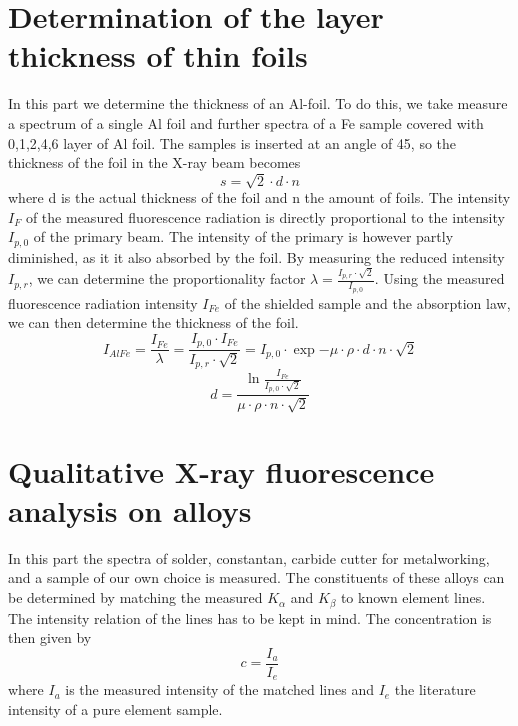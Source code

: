 \section{Determination of the layer thickness of thin foils}
\label{section: determination}
In this part we determine the thickness of an Al-foil. To do this, we take measure a spectrum of a single Al foil and further spectra of a Fe sample covered with 0,1,2,4,6 layer of Al foil.
The samples is inserted at an angle of 45\degree, so the thickness of the foil in the X-ray beam becomes
$$s = \sqrt{2} \cdot d \cdot n$$
where d is the actual thickness of the foil and n the amount of foils. 
The intensity $I_F$ of the measured fluorescence radiation is directly proportional to the intensity $I_{p,0}$ of the primary beam. The intensity of the primary is however partly diminished, as it it also absorbed by the foil. By measuring the reduced intensity $I_{p,r}$, we can determine the proportionality factor $\lambda = \frac{I_{p,r} \cdot \sqrt{2}}{I_{p,0}}$. Using the measured fluorescence radiation intensity $I_{Fe}$ of the shielded sample and the absorption law, we can then determine the thickness of the foil. 
$$I_{AlFe} = \frac{I_{Fe}}{\lambda} = \frac{I_{p,0} \cdot I_{Fe}}{I_{p,r} \cdot \sqrt{2}} = I_{p,0} \cdot \exp{-\mu \cdot \rho \cdot d \cdot n \cdot \sqrt{2}}$$
$$d = \frac{\ln{\frac{I_{Fe}}{I_{p,0}\cdot \sqrt{2}}}}{\mu \cdot \rho \cdot n  \cdot \sqrt{2}}$$


\section{Qualitative X-ray fluorescence analysis on alloys}
In this part the spectra of solder, constantan, carbide cutter for
metalworking, and a sample of our own choice is measured. The constituents of these alloys can be determined by matching the measured $K_\alpha$ and $K_\beta$ to known element lines. The intensity relation of the lines has to be kept in mind. The concentration is then given by $$c = \frac{I_a}{I_e}$$ where $I_a$ is the measured intensity of the matched lines and $I_e$ the literature intensity of a pure element sample. 